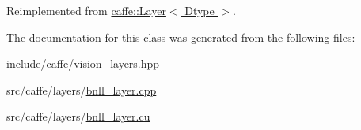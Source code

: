 Reimplemented from \hyperlink{classcaffe_1_1_layer_a2d78dbf5d8bc36928bd8f6fcfbafbcef}{caffe\+::\+Layer$<$ Dtype $>$}.



The documentation for this class was generated from the following files\+:\begin{DoxyCompactItemize}
\item 
include/caffe/\hyperlink{vision__layers_8hpp}{vision\+\_\+layers.\+hpp}\item 
src/caffe/layers/\hyperlink{bnll__layer_8cpp}{bnll\+\_\+layer.\+cpp}\item 
src/caffe/layers/\hyperlink{bnll__layer_8cu}{bnll\+\_\+layer.\+cu}\end{DoxyCompactItemize}
